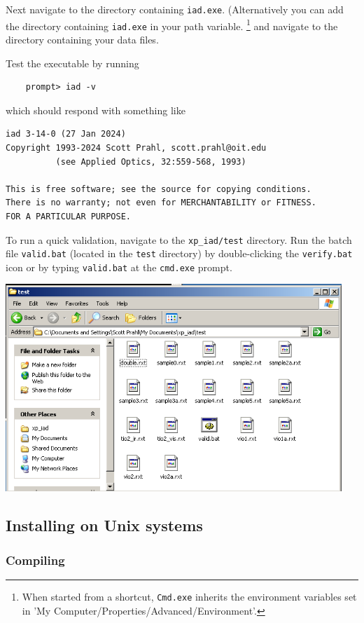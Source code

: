 \documentclass{article}
\begin{document}
Next navigate to the directory containing \texttt{iad.exe}.  
(Alternatively you 
can add the directory containing \texttt{iad.exe} in your path variable.%
\footnote{
When started from a shortcut, \texttt{Cmd.exe} inherits the environment variables set in 
'My Computer/Properties/Advanced/Environment'.} and
navigate to the directory containing your data files.

Test the executable by running
\begin{verbatim}
    prompt> iad -v
\end{verbatim}
which should respond with something like
\begin{verbatim}
iad 3-14-0 (27 Jan 2024)
Copyright 1993-2024 Scott Prahl, scott.prahl@oit.edu
          (see Applied Optics, 32:559-568, 1993)

This is free software; see the source for copying conditions.
There is no warranty; not even for MERCHANTABILITY or FITNESS.
FOR A PARTICULAR PURPOSE.
\end{verbatim}

To run a quick validation, navigate to the \texttt{xp\_iad/test} directory.  Run the
batch file \texttt{valid.bat} (located in the \texttt{test} directory) by
double-clicking the \texttt{verify.bat} icon or by typing \texttt{valid.bat} at
the \texttt{cmd.exe} prompt.
\begin{center}
\includegraphics[width=5in]{valid.png}
\end{center}

\subsection{Installing on Unix systems}

\subsubsection{Compiling}
\end{document}
